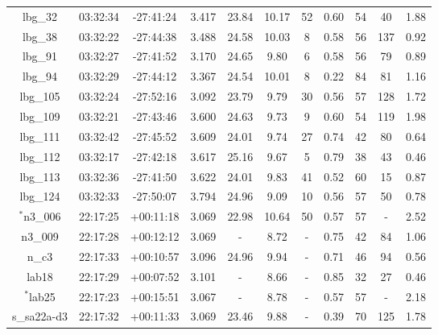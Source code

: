 \documentclass[fleqn,usenatbib]{mn2e}
\begin{document}
\begin{table*}
\begin{threeparttable}
\begin{tabular}{ccccccccccc}
lbg\_32         & 03:32:34 & -27:41:24 & 3.417      & 23.84  & 10.17 & 52 & 0.60         & 54        & 40    & 1.88      \\
lbg\_38         & 03:32:22 & -27:44:38 & 3.488       & 24.58  & 10.03 & 8  & 0.58        & 56        & 137   & 0.92      \\
lbg\_91         & 03:32:27 & -27:41:52 & 3.170       & 24.65  & 9.80   & 6  & 0.58        & 56        & 79    & 0.89 \\
lbg\_94         & 03:32:29 & -27:44:12 & 3.367       & 24.54  & 10.01 & 8  & 0.22        & 84        & 81    & 1.16      \\
lbg\_105        & 03:32:24 & -27:52:16 & 3.092      & 23.79  & 9.79  & 30 & 0.56        & 57        & 128   & 1.72      \\
lbg\_109        & 03:32:21 & -27:43:46 & 3.600       & 24.63  & 9.73  & 9  & 0.60         & 54        & 119   & 1.98      \\
lbg\_111        & 03:32:42 & -27:45:52 & 3.609       & 24.01  & 9.74  & 27 & 0.74        & 42        & 80    & 0.64      \\
lbg\_112         & 03:32:17 & -27:42:18 & 3.617        & 25.16  & 9.67  & 5  & 0.79         & 38        & 43    & 0.46      \\
lbg\_113        & 03:32:36 & -27:41:50 & 3.622      & 24.01  & 9.83  & 41 & 0.52        & 60        & 15    & 0.87      \\
lbg\_124         & 03:32:33 & -27:50:07 & 3.794        & 24.96  & 9.09  & 10  & 0.56         & 57        & 50    & 0.78      \\
$^{*}$n3\_006       & 22:17:25 & +00:11:18 & 3.069     & 22.98 & 10.64 & 50 & 0.57         & 57        & -    & 2.52      \\
n3\_009       & 22:17:28 & +00:12:12 & 3.069 & -    & 8.72  & -            & 0.75        & 42        & 84    & 1.06      \\
n\_c3         & 22:17:33 & +00:10:57 & 3.096       & 24.96 & 9.94  & -            & 0.71        & 46        & 94    & 0.56      \\
lab18         & 22:17:29 & +00:07:52 & 3.101           & -    & 8.66  & -            & 0.85        & 32        & 27    & 0.46      \\
$^{*}$lab25         & 22:17:23 & +00:15:51 & 3.067      & -    & 8.78  & -            & 0.57         & 57        & -    & 2.18      \\
s\_sa22a-d3   & 22:17:32 & +00:11:33 & 3.069 & 23.46 & 9.88  & -            & 0.39        & 70        & 125   & 1.78      \\

\end{tabular}
\end{threeparttable}
\end{table*}
\end{document}
